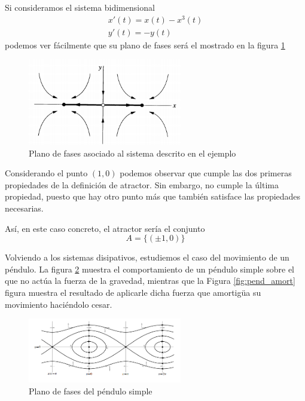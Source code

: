 \begin{example}
Si consideramos el sistema bidimensional
\[\begin{array}{l}
x'(t) = x(t)-x^3(t) \\
y'(t) = -y(t)
\end{array}\]
podemos ver fácilmente que su plano de fases será el mostrado en la figura \ref{fig:planoFasesAtractorEjemplo}
\begin{figure}[H]
\centering
\includegraphics[width = 0.6\textwidth]{img/atractorExample.png}
\caption{Plano de fases asociado al sistema descrito en el ejemplo}
\label{fig:planoFasesAtractorEjemplo}
\end{figure}

Considerando el punto $(1,0)$ podemos observar que cumple las dos primeras propiedades de la definición de atractor. Sin embargo, no cumple la última propiedad, puesto que hay otro punto más que también satisface las propiedades necesarias.

Así, en este caso concreto, el atractor sería el conjunto
\[A=\{(\pm 1, 0)\}\]
\end{example}


Volviendo a los sistemas disipativos, estudiemos el caso del movimiento de un péndulo. La figura \ref{fig:pend_simple} muestra el comportamiento de un péndulo simple sobre el que no actúa la fuerza de la gravedad, mientras que la Figura \ref{fig:pend_amort} figura muestra el resultado de aplicarle dicha fuerza que amortigüa su movimiento haciéndolo cesar.

\begin{figure}[hbtp]
\centering
\includegraphics[width = 0.6\textwidth]{img/pend_simple.jpg}
\caption{Plano de fases del péndulo simple}
\label{fig:pend_simple}
\end{figure}

